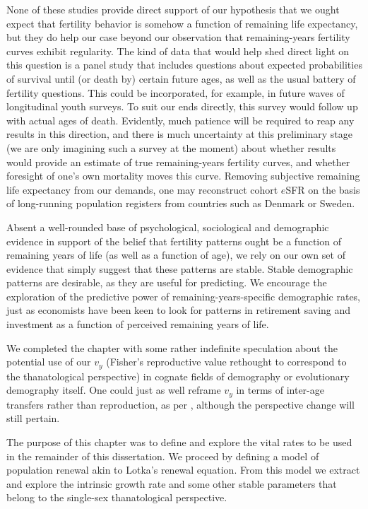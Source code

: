 None of these studies provide
direct support of our hypothesis that we ought expect that fertility behavior is
somehow a function of remaining life expectancy, but they do help our case
beyond our observation that remaining-years fertility curves exhibit regularity. 
The kind of data that would help shed direct light on this question is a
panel study that includes questions about expected probabilities of survival 
until (or death by) certain future ages, as well as the usual battery of fertility 
questions. This could be incorporated, for example, in future waves of
longitudinal youth surveys. To suit our ends directly, this survey would follow
up with actual ages of death. Evidently, much patience will be required to reap
any results in this direction, and there is much uncertainty at this preliminary
stage (we are only imagining such a survey at the moment) about whether results
would provide an estimate of true remaining-years fertility curves, and whether
foresight of one's own mortality moves this curve. Removing subjective
remaining life expectancy from our demands, one may reconstruct cohort $e$SFR on 
the basis of long-running population registers from countries such as Denmark or
Sweden.

Absent a well-rounded base of psychological, sociological and demographic
evidence in support of the belief that fertility patterns ought be a function of
remaining years of life (as well as a function of age), we rely on our own
set of evidence that simply suggest that these patterns are stable. Stable
demographic patterns are desirable, as they are useful for predicting. We encourage
the exploration of the predictive power of remaining-years-specific
demographic rates, just as economists have been keen to look for patterns in
retirement saving and investment as a function of perceived remaining years of
life.

We completed the chapter with some rather indefinite speculation about the
potential use of our $v_y$ (Fisher's reproductive value rethought to correspond
to the thanatological perspective) in cognate fields of demography or
evolutionary demography itself. One could just as well reframe $v_y$ in terms of
inter-age transfers rather than reproduction, as per \citet{lee2003rethinking},
although the perspective change will still pertain.

The purpose of this chapter was to define and explore the vital rates to be used
in the remainder of this dissertation. We proceed by defining a model of
population renewal akin to Lotka's renewal equation. From this model we
extract and explore the intrinsic growth rate and some other stable
parameters that belong to the single-sex thanatological perspective. 

\FloatBarrier



